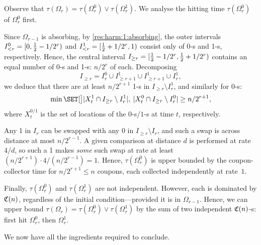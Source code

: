 \documentclass{article}
\begin{document}
\begin{Proof}
Observe that $\tau(\Omega_r) = \tau(\Omega_r^0) \vee \tau(\Omega_r^1)$.
We analyse the hitting time $\tau(\Omega_r^0)$ of $\Omega_r^0$ first.

Since $\Omega_{r-1}$ is absorbing, by \cref{res:harm:1:absorbing}, the outer intervals $I_{< r}^0 = [0, \tfrac12 - 1/2^r)$ and $I_{< r}^1 = [\tfrac12 + 1/2^r, 1)$ consist only of 0-s and 1-s, respectively.
Hence, the central interval $I_{\ge r} = [ \tfrac12 - 1/2^r, \tfrac12 + 1/2^r )$ contains an equal number of 0-s and 1-s:
	$n/2^r$ of each.
Decomposing
\[
	I_{\ge r}
=
	I_r^0 \cup I_{\ge r+1}^1
\cup
	I_{\ge r+1}^1 \cup I_r^1,
\]
we deduce that there are at least $n/2^{r+1}$ 1-s in
$I_{\ge r} \setminus I_r^1$,
and similarly for 0-s:
\[
	\min\set*{ 
		\abs{ X_t^1 \cap I_{\ge r} \setminus I_r^1 },
	\:	\abs{ X_t^0 \cap I_{\ge r} \setminus I_r^0 }
	}
\ge
	n/2^{r+1},
\]
where $X_t^{0/1}$ is the set of locations of the $0$-s/$1$-s at time $t$, respectively.

Any 1 in $I_r$ can be swapped with any 0 in $I_{\ge r} \setminus I_r$, and such a swap is across distance at most $n/2^{r-1}$.
A given comparison at distance $d$ is performed at rate $4/d$, so such a 1 makes \emph{some} such swap at rate at least
\(
	(n / 2^{r+1}) \cdot 4/(n / 2^{r-1})
=
	1.
\)
Hence, $\tau(\Omega_r^0)$ is upper bounded by the coupon-collector time for $n/2^{r+1} \le n$ coupons, each collected independently at rate~$1$.

Finally, $\tau(\Omega_r^0)$ and $\tau(\Omega_r^1)$ are not independent.
However, each is dominated by $\mathfrak{C}(n)$, regardless of the initial condition---provided it is in $\Omega_{r-1}$.
Hence, we can upper bound $\tau(\Omega_r) = \tau(\Omega_r^0) \vee \tau(\Omega_r^1)$ by the sum of two independent $\mathfrak{C}(n)$-s:
	first hit $\Omega_r^0$, then $\Omega_r^1$.
\end{Proof}

We now have all the ingredients required to conclude.
\end{document}
